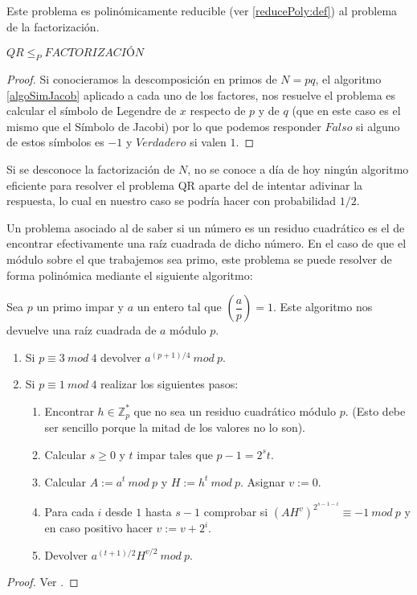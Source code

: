 Este problema es polin\'omicamente reducible (ver \ref{reducePoly:def}) al
problema de la factorizaci\'on.

\begin{proposition}
	 $QR \leq_P FACTORIZACIÓN$
\end{proposition}
\begin{proof}
Si conocieramos la descomposición en primos de $N = pq$, el algoritmo \ref{algoSimJacob} aplicado a cada uno de los factores,
nos resuelve el problema es calcular el símbolo de Legendre de $x$ respecto de $p$ y de $q$ (que en este caso es el mismo que el S\'imbolo de Jacobi)
por lo que podemos responder $Falso$ si alguno de estos s\'imbolos es $-1$ y $Verdadero$ si valen $1$.
\end{proof}

Si se desconoce la factorización de $N$, no se conoce a día de hoy ningún
algoritmo eficiente para resolver el problema QR aparte del de intentar
adivinar la respuesta, lo cual en nuestro caso se podr\'ia hacer con
probabilidad $1/2$.

Un problema asociado al de saber si un n\'umero es un residuo cuadr\'atico es el de encontrar efectivamente una ra\'iz cuadrada de dicho n\'umero.
En el caso de que el m\'odulo sobre el que trabajemos sea primo, este problema se puede resolver de forma polin\'omica mediante el siguiente algoritmo:

\begin{algorithm}[Tonelli]
\label{algoTonelli}
Sea $p$ un primo impar y $a$ un entero tal que $\left( \dfrac{a}{p} \right) = 1$.
Este algoritmo nos devuelve una ra\'iz cuadrada de $a$ m\'odulo $p$.
\begin{enumerate}
\item Si $p \equiv 3 ~mod~4$ devolver $a^{(p+1)/4}~mod~p$.
\item Si $p \equiv 1 ~mod~4$ realizar los siguientes pasos:
\begin{enumerate}
\item Encontrar $h \in {\mathbb Z}_p^*$ que no sea un residuo cuadr\'atico m\'odulo $p$. (Esto debe ser sencillo porque la mitad de los valores no lo son).
\item Calcular $s \geq 0$ y $t$ impar tales que $p-1 = 2^s t$.
\item Calcular $A := a^t ~mod~p$ y $H:=h^t~mod~p$. Asignar $v:=0$.
\item Para cada $i$ desde $1$ hasta $s-1$ comprobar si $(AH^v)^{2^{s-1-i}} \equiv -1 ~mod~p$ y en caso positivo hacer $v := v + 2^i$.
\item Devolver $a^{(t+1)/2} H^{v/2} ~mod~p$.
\end{enumerate}
\end{enumerate}
\end{algorithm}
\begin{proof}
Ver \cite[Proposition 2.16]{Pardo}.
\end{proof}


